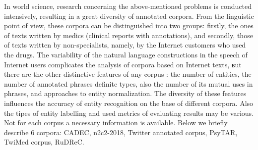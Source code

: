 \documentclass[a4paper,fleqn,longmktitle]{cas-dc}
\begin{document}

 In world science, research concerning the above-mentioned problems is conducted intensively, resulting in a great diversity of annotated corpora. From the linguistic point of view, these corpora can be distinguished  into two groups: firstly, the ones of texts written by medics (clinical reports with annotations), and secondly, those of texts written by non-specialists, namely, by the Internet customers who used the drugs. The variability of the natural language constructions in the speech of Internet users complicates the analysis of corpora based on Internet texts, вut there are the other distinctive features of any corpus : the number of entities, the number of annotated phrases definite types, also the number of its mutual uses in phrases, and approaches to entity normalization.  The diversity of these features influences the accuracy of entity recognition on the base of different corpora. Also the  tipes of entity labelling  and   used metrics of evaluating results may be various.   Not for each corpus  a necessary information is available.%
 Below we briefly describe 6 corpora: CADEC, n2c2-2018, Twitter annotated corpus, PsyTAR, TwiMed corpus, RuDReC. %

     
\end{document}

